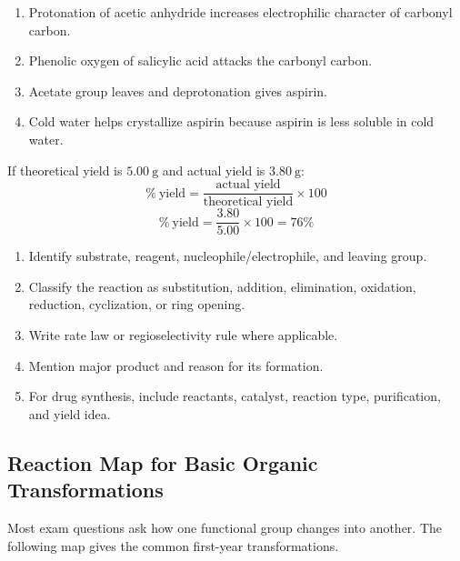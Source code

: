 \documentclass[12pt,a4paper]{article}
\begin{document}
\begin{enumerate}[leftmargin=*, itemsep=3pt, topsep=2pt]
  \item Protonation of acetic anhydride increases electrophilic character of carbonyl carbon.
  \item Phenolic oxygen of salicylic acid attacks the carbonyl carbon.
  \item Acetate group leaves and deprotonation gives aspirin.
  \item Cold water helps crystallize aspirin because aspirin is less soluble in cold water.
\end{enumerate}

\begin{tcolorbox}[examplebox, title={Aspirin Yield Calculation}]
If theoretical yield is $5.00\ \mathrm{g}$ and actual yield is $3.80\ \mathrm{g}$:
\[
\%\ \text{yield}=\frac{\text{actual yield}}{\text{theoretical yield}}\times100
\]
\[
\%\ \text{yield}=\frac{3.80}{5.00}\times100=76\%
\]
\end{tcolorbox}

\begin{tcolorbox}[masonbox, title={Organic Reaction Answer Checklist}]
\begin{enumerate}[leftmargin=*, itemsep=3pt, topsep=2pt]
  \item Identify substrate, reagent, nucleophile/electrophile, and leaving group.
  \item Classify the reaction as substitution, addition, elimination, oxidation, reduction, cyclization, or ring opening.
  \item Write rate law or regioselectivity rule where applicable.
  \item Mention major product and reason for its formation.
  \item For drug synthesis, include reactants, catalyst, reaction type, purification, and yield idea.
\end{enumerate}
\end{tcolorbox}

\subsection{Reaction Map for Basic Organic Transformations}
Most exam questions ask how one functional group changes into another. The following map gives the common first-year transformations.
\end{document}
